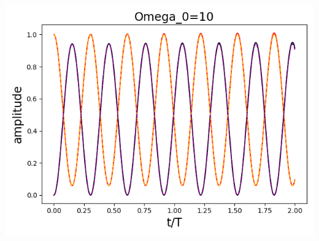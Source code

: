 \documentclass[11pt, oneside]{book}
\theoremstyle{break}
\theoremstyle{break}
\begin{document}
\begin{center}
\includegraphics[scale=0.39]{542HW1/a10}\\
\end{center}
\hfill\break
\end{document}
